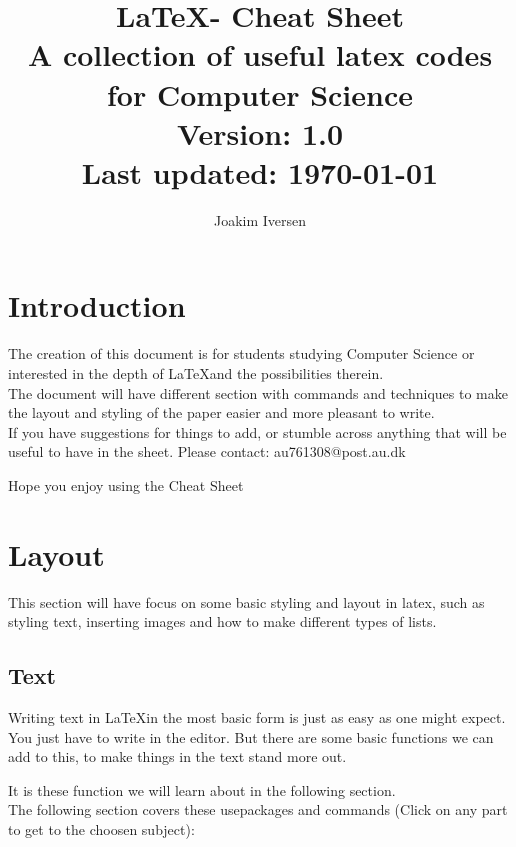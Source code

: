 \documentclass{article}
\title{\LaTeX - Cheat Sheet \\
        \large A collection of useful latex codes for Computer Science \\
        Version: 1.0 \\
        Last updated: \today
}
\author{Joakim Iversen}
\date{}
\begin{document}
\begin{titlingpage}
    \maketitle
\end{titlingpage} %
\newpage

\tableofcontents %
\newpage


\section{Introduction}
The creation of this document is for students studying Computer Science or interested in the depth of \LaTeX and the possibilities therein. \\
The document will have different section with commands and techniques to make the layout and styling of the paper easier and more pleasant to write. \\

If you have suggestions for things to add, or stumble across anything that will be useful to have in the sheet. Please contact: au761308@post.au.dk \\
\begin{center}
    Hope you enjoy using the Cheat Sheet \Coffeecup
\end{center}


\newpage

\section{Layout}
This section will have focus on some basic styling and layout in latex, such as styling text, inserting images and how to make different types of lists. \\


\subsection{Text}
Writing text in \LaTeX in the most basic form is just as easy as one might expect. You just have to write in the editor. 
But there are some basic functions we can add to this, to make things in the text stand more out. 

It is these function we will learn about in the following section. \\
The following section covers these usepackages and commands (Click on any part to get to the choosen subject): \\
\end{document}
